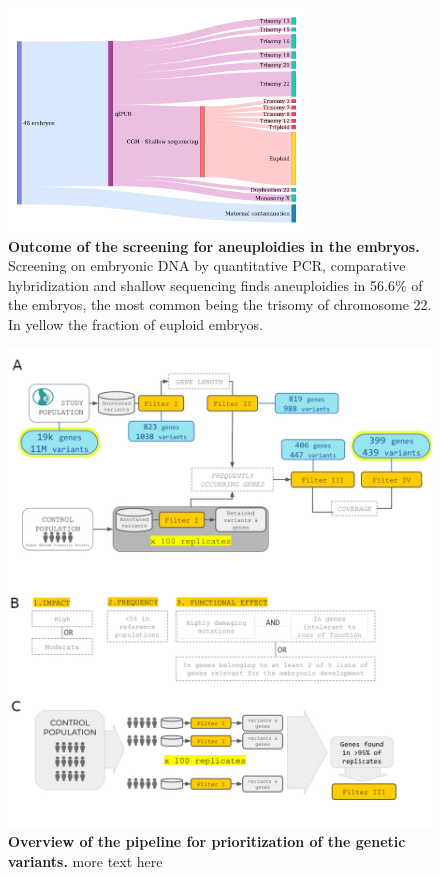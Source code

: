 \begin{figure}[h]
\centering
\includegraphics[width=0.7\textwidth]{fig/ibelieve.png}
\caption{\textbf{Outcome of the screening for aneuploidies in the embryos.} Screening on embryonic DNA by quantitative PCR, comparative hybridization and shallow sequencing finds aneuploidies in  56.6\% of the embryos, the most common being the trisomy of chromosome 22. In yellow the fraction of euploid embryos. }
\label{fig:presequencing}
\end{figure}

\begin{figure}[ht]
\centering
\includegraphics[width=\linewidth]{fig/pipe.jpg}
\caption{\textbf{Overview of the pipeline for prioritization of the genetic variants.} more text here } 
\label{fig:pipeline}
\end{figure}


